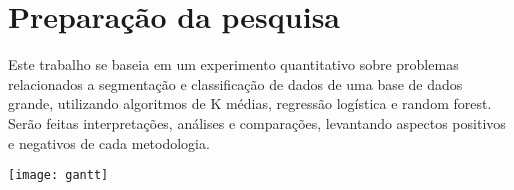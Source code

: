 
\part{Preparação da pesquisa}

Este trabalho se baseia em um experimento quantitativo sobre problemas relacionados a segmentação e classificação de dados de uma base de dados grande, utilizando algoritmos de K médias, regressão logística e random forest. Serão feitas interpretações, análises e comparações, levantando aspectos positivos e negativos de cada metodologia.

\begin{landscape}
\centering
\begin{vplace}[0.7]
\texttt{[image: gantt]}
\end{vplace}
\end{landscape}

